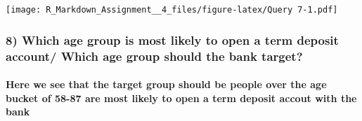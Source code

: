 \documentclass[]{article}
\newenvironment{Shaded}{\begin{snugshade}}{\end{snugshade}}
\newcommand{\KeywordTok}[1]{\textcolor[rgb]{0.13,0.29,0.53}{\textbf{#1}}}
\newcommand{\DataTypeTok}[1]{\textcolor[rgb]{0.13,0.29,0.53}{#1}}
\newcommand{\DecValTok}[1]{\textcolor[rgb]{0.00,0.00,0.81}{#1}}
\newcommand{\StringTok}[1]{\textcolor[rgb]{0.31,0.60,0.02}{#1}}
\newcommand{\OtherTok}[1]{\textcolor[rgb]{0.56,0.35,0.01}{#1}}
\newcommand{\OperatorTok}[1]{\textcolor[rgb]{0.81,0.36,0.00}{\textbf{#1}}}
\newcommand{\NormalTok}[1]{#1}
\let\oldparagraph\paragraph
\renewcommand{\paragraph}[1]{\oldparagraph{#1}\mbox{}}
\begin{document}
\texttt{[image: R\_Markdown\_Assignment\_\_4\_files/figure-latex/Query 7-1.pdf]}

\subsubsection{8) Which age group is most likely to open a term deposit
account/ Which age group should the bank
target?}\label{which-age-group-is-most-likely-to-open-a-term-deposit-account-which-age-group-should-the-bank-target}

\paragraph{Here we see that the target group should be people over the
age bucket of 58-87 are most likely to open a term deposit accout with
the
bank}\label{here-we-see-that-the-target-group-should-be-people-over-the-age-bucket-of-58-87-are-most-likely-to-open-a-term-deposit-accout-with-the-bank}

\begin{Shaded}
\end{Shaded}
\end{document}
